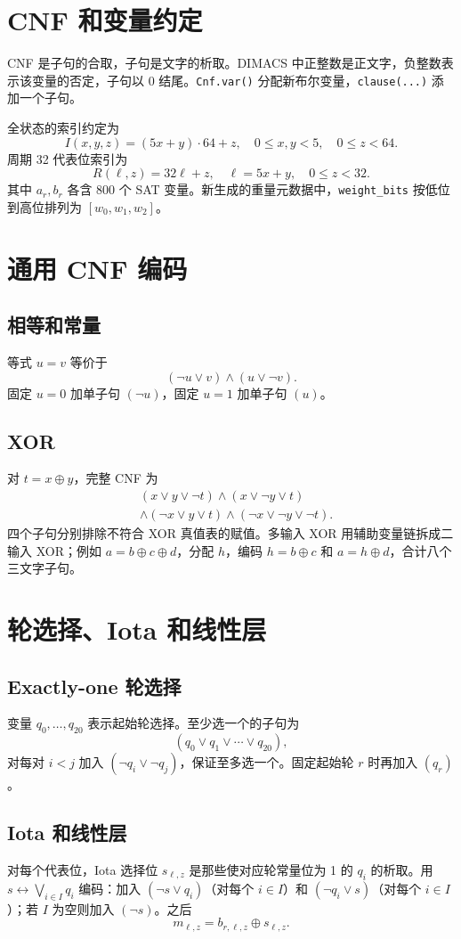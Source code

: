 \documentclass[UTF8,a4paper]{ctexart}
\begin{document}
\section{CNF 和变量约定}
CNF 是子句的合取，子句是文字的析取。DIMACS 中正整数是正文字，负整数表示该变量的否定，子句以 0 结尾。\texttt{Cnf.var()} 分配新布尔变量，\texttt{clause(...)} 添加一个子句。

全状态的索引约定为
\[
I(x,y,z)=(5x+y)\cdot64+z,
\quad 0\le x,y<5,\quad0\le z<64.
\]
周期 32 代表位索引为
\[
R(\ell,z)=32\ell+z,\quad \ell=5x+y,\quad0\le z<32.
\]
其中 \(a_r,b_r\) 各含 800 个 SAT 变量。新生成的重量元数据中，\texttt{weight\_bits} 按低位到高位排列为 \([w_0,w_1,w_2]\)。

\section{通用 CNF 编码}
\subsection{相等和常量}
等式 \(u=v\) 等价于
\[
(\neg u\lor v)\land(u\lor\neg v).
\]
固定 \(u=0\) 加单子句 \((\neg u)\)，固定 \(u=1\) 加单子句 \((u)\)。

\subsection{XOR}
对 \(t=x\oplus y\)，完整 CNF 为
\[
\begin{split}
&(x\lor y\lor\neg t)\land(x\lor\neg y\lor t)\\
&\land(\neg x\lor y\lor t)\land(\neg x\lor\neg y\lor\neg t).
\end{split}
\]
四个子句分别排除不符合 XOR 真值表的赋值。多输入 XOR 用辅助变量链拆成二输入 XOR；例如 \(a=b\oplus c\oplus d\)，分配 \(h\)，编码 \(h=b\oplus c\) 和 \(a=h\oplus d\)，合计八个三文字子句。

\section{轮选择、Iota 和线性层}
\subsection{Exactly-one 轮选择}
变量 \(q_0,\ldots,q_{20}\) 表示起始轮选择。至少选一个的子句为
\[
(q_0\lor q_1\lor\cdots\lor q_{20}),
\]
对每对 \(i<j\) 加入 \((\neg q_i\lor\neg q_j)\)，保证至多选一个。固定起始轮 \(r\) 时再加入 \((q_r)\)。

\subsection{Iota 和线性层}
对每个代表位，Iota 选择位 \(s_{\ell,z}\) 是那些使对应轮常量位为 1 的 \(q_i\) 的析取。用 \(s\leftrightarrow\bigvee_{i\in I}q_i\) 编码：加入 \((\neg s\lor q_i)\)（对每个 \(i\in I\)）和 \((\neg q_i\lor s)\)（对每个 \(i\in I\)）；若 \(I\) 为空则加入 \((\neg s)\)。之后
\[
m_{\ell,z}=b_{r,\ell,z}\oplus s_{\ell,z}.
\]
\end{document}
